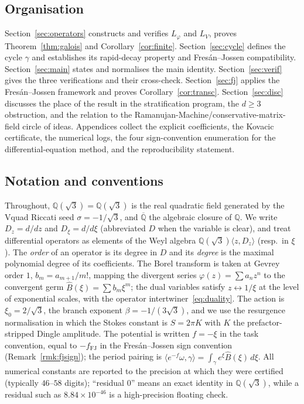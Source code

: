 \documentclass[11pt,reqno]{amsart}
\renewcommand{\_}{\vquadorigunderscore\allowbreak}
\theoremstyle{plain}
\theoremstyle{definition}
\newcommand{\Bhat}{\widehat{B}}
\newcommand{\Lphi}{L_{\varphi}}
\newcommand{\LV}{L_{V}}
\newcommand{\Qsqrt}{\mathbb{Q}(\sqrt3)}
\newcommand{\Qbar}{\overline{\mathbb{Q}}}
\newcommand{\xizero}{\xi_0}
\begin{document}
\subsection{Organisation}
Section~\ref{sec:operators} constructs and verifies $\Lphi$ and $\LV$, proves
Theorem~\ref{thm:galois} and Corollary~\ref{cor:finite}. Section~\ref{sec:cycle} defines the
cycle $\gamma$ and establishes its rapid-decay property and Fres\'an--Jossen compatibility.
Section~\ref{sec:main} states and normalises the main identity. Section~\ref{sec:verif} gives
the three verifications and their cross-check. Section~\ref{sec:fj} applies the
Fres\'an--Jossen framework and proves Corollary~\ref{cor:transc}.
Section~\ref{sec:disc} discusses the place of the result in the stratification program, the
$d\ge3$ obstruction, and the relation to the Ramanujan-Machine/conservative-matrix-field
circle of ideas. Appendices collect the explicit coefficients, the Kovacic certificate, the
numerical logs, the four sign-convention enumeration for the differential-equation method, and
the reproducibility statement.

\subsection{Notation and conventions}
Throughout, $\Qsqrt=\mathbb{Q}(\sqrt3)$ is the real quadratic field generated by the V\_quad
Riccati seed $\sigma=-1/\sqrt3$, and $\Qbar$ the algebraic closure of $\mathbb{Q}$. We write
$D_z=d/dz$ and $D_\xi=d/d\xi$ (abbreviated $D$ when the variable is clear), and treat differential
operators as elements of the Weyl algebra $\Qsqrt\langle z,D_z\rangle$ (resp.\ in $\xi$). The
\emph{order} of an operator is its degree in $D$ and its \emph{degree} is the maximal polynomial
degree of its coefficients. The Borel transform is taken at Gevrey order $1$, $b_m=a_{m+1}/m!$,
mapping the divergent series $\varphi(z)=\sum a_nz^n$ to the convergent germ
$\Bhat(\xi)=\sum b_m\xi^m$; the dual variables satisfy $z\leftrightarrow1/\xi$ at the level of
exponential scales, with the operator intertwiner~\eqref{eq:duality}. The action is
$\xizero=2/\sqrt3$, the branch exponent $\beta=-1/(3\sqrt3)$, and we use the resurgence
normalisation in which the Stokes constant is $S=2\pi K$ with $K$ the prefactor-stripped Dingle
amplitude. The potential is written $f=-\xi$ in the task convention, equal to $-f_{\mathrm{FJ}}$ in
the Fres\'an--Jossen sign convention (Remark~\ref{rmk:fjsign}); the period pairing is
$\langle e^{-f}\omega,\gamma\rangle=\int_\gamma e^{\xi}\Bhat(\xi)\,d\xi$. All numerical constants
are reported to the precision at which they were certified (typically $46$--$58$ digits);
``residual $0$'' means an exact identity in $\Qsqrt$, while a residual such as
$8.84\times10^{-46}$ is a high-precision floating check.
\end{document}
